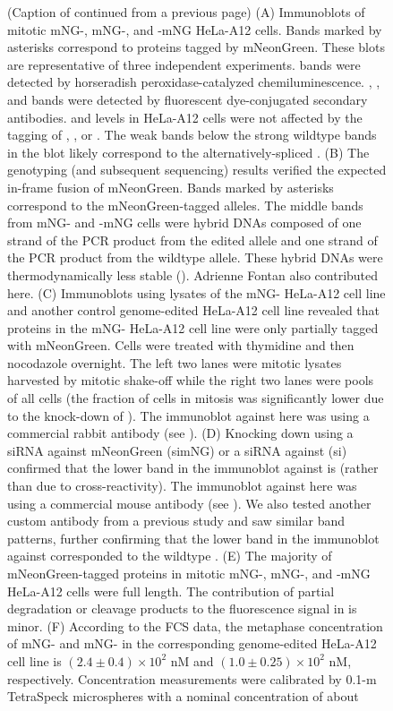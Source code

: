 \begin{figure}
    \noindent\justifying (Caption of  continued from a previous page) (A) Immunoblots of mitotic mNG-, mNG-, and -mNG HeLa-A12 cells. Bands marked by asterisks correspond to proteins tagged by mNeonGreen. These blots are representative of three independent experiments.  bands were detected by horseradish peroxidase-catalyzed chemiluminescence. , , and  bands were detected by fluorescent dye-conjugated secondary antibodies.  and  levels in HeLa-A12 cells were not affected by the  tagging of , , or . The weak bands below the strong wildtype bands in the  blot likely correspond to the alternatively-spliced  \cite{Mad1beta}. (B) The genotyping (and subsequent sequencing) results verified the expected in-frame fusion of mNeonGreen. Bands marked by asterisks correspond to the mNeonGreen-tagged alleles. The middle bands from mNG- and -mNG cells were hybrid DNAs composed of one strand of the PCR product from the edited allele and one strand of the PCR product from the wildtype allele. These hybrid DNAs were thermodynamically less stable (). Adrienne Fontan also contributed here. (C) Immunoblots using lysates of the mNG- HeLa-A12 cell line and another control genome-edited HeLa-A12 cell line revealed that  proteins in the mNG- HeLa-A12 cell line were only partially tagged with mNeonGreen. Cells were treated with thymidine and then nocodazole overnight. The left two lanes were mitotic lysates harvested by mitotic shake-off while the right two lanes were pools of all cells (the fraction of cells in mitosis was significantly lower due to the knock-down of ). The immunoblot against  here was using a commercial rabbit antibody (see ). (D) Knocking down  using a siRNA against mNeonGreen (simNG) or a siRNA against  (si) confirmed that the lower band in the immunoblot against  is  (rather than due to cross-reactivity). The immunoblot against  here was using a commercial mouse antibody (see ). We also tested another custom antibody from a previous study \cite{SheepAntiBUB1} and saw similar band patterns, further confirming that the lower band in the immunoblot against  corresponded to the wildtype . (E) The majority of mNeonGreen-tagged proteins in mitotic mNG-, mNG-, and -mNG HeLa-A12 cells were full length. The contribution of partial degradation or cleavage products to the fluorescence signal in  is minor. (F) According to the FCS data, the metaphase concentration of mNG- and mNG- in the corresponding genome-edited HeLa-A12 cell line is $(2.4 \pm 0.4) \times 10^2$ nM and $(1.0 \pm 0.25) \times 10^2$ nM, respectively. Concentration measurements were calibrated by 0.1-\textmu{}m TetraSpeck\texttrademark{} microspheres with a nominal concentration of about 
\end{figure}
